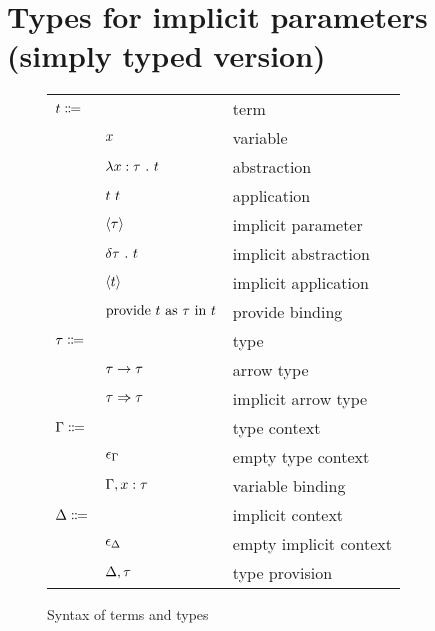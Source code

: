 \documentclass[acmlarge]{acmart}
\begin{document}
\section{Types for implicit parameters (simply typed version)}

  \begin{figure}
    \begin{mdframed}

      \begin{tabular}{l l l}
        $t \Coloneqq $ & & term \\
        & $x$ & variable \\
        & $\lambda x : \tau \ . \ t$ & abstraction \\
        & $t \ t$ & application \\
        & $\left\langle \tau \right\rangle$ & implicit parameter \\
        & $\delta \tau \ . \ t$ & implicit abstraction \\
        & $\left\langle t \right\rangle$ & implicit application \\
        & $\text{provide } t \text{ as } \tau \text{ in } t$ & provide binding \\
        $\tau \Coloneqq$ & & type \\
        & $\tau \rightarrow \tau$ & arrow type \\
        & $\tau \Rightarrow \tau$ & implicit arrow type \\
        $\Gamma \Coloneqq$ & & type context \\
        & $\epsilon_{\Gamma}$ & empty type context \\
        & $\Gamma, x : \tau$ & variable binding \\
        $\Delta \Coloneqq$ & & implicit context \\
        & $\epsilon_{\Delta}$ & empty implicit context \\
        & $\Delta, \tau$ & type provision
      \end{tabular}

      \caption{Syntax of terms and types}
      \label{fig:terms_syntax}

    \end{mdframed}
  \end{figure}
\end{document}
